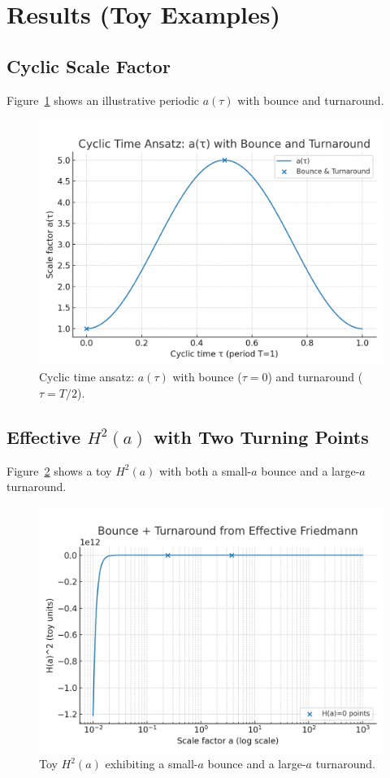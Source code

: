 \documentclass[12pt]{article}
\begin{document}
\section{Results (Toy Examples)}
\subsection{Cyclic Scale Factor}
Figure~\ref{fig:atau} shows an illustrative periodic $a(\tau)$ with bounce and turnaround.

\begin{figure}[h]
\centering
\includegraphics[width=0.7\linewidth]{figures/plot_a_tau.png}
\caption{Cyclic time ansatz: $a(\tau)$ with bounce ($\tau=0$) and turnaround ($\tau=T/2$).}
\label{fig:atau}
\end{figure}

\subsection{Effective $H^2(a)$ with Two Turning Points}
Figure~\ref{fig:h2a} shows a toy $H^2(a)$ with both a small-$a$ bounce and a large-$a$ turnaround.

\begin{figure}[h]
\centering
\includegraphics[width=0.7\linewidth]{figures/plot_H2.png}
\caption{Toy $H^2(a)$ exhibiting a small-$a$ bounce and a large-$a$ turnaround.}
\label{fig:h2a}
\end{figure}
\end{document}

